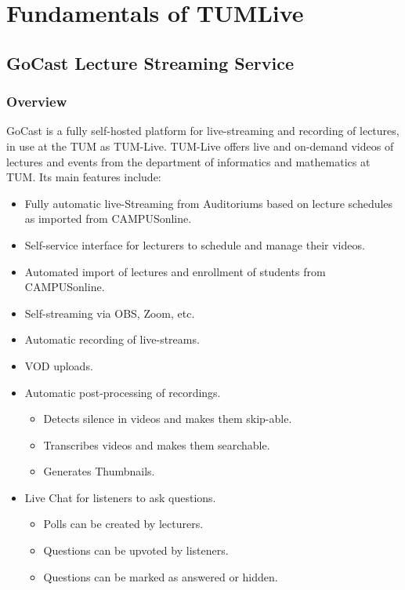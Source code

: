 
\chapter{Fundamentals of TUMLive}\label{chapter:fundamentals}

\section{GoCast Lecture Streaming Service}

\subsection{Overview}

GoCast is a fully self-hosted platform for live-streaming and recording of lectures, in use at the \ac{TUM} as TUM-Live.
TUM-Live offers live and on-demand videos of lectures and events from the department of informatics and mathematics at \ac{TUM}. 
Its main features include:

\begin{itemize}
    \item Fully automatic live-Streaming from Auditoriums based on lecture schedules as imported from CAMPUSonline.
    \item Self-service interface for lecturers to schedule and manage their videos.
    \item Automated import of lectures and enrollment of students from CAMPUSonline.
    \item Self-streaming via OBS, Zoom, etc.
    \item Automatic recording of live-streams.
    \item \ac{VOD} uploads.
    \item Automatic post-processing of recordings.
    \begin{itemize}
        \item Detects silence in videos and makes them skip-able.
        \item Transcribes videos and makes them searchable.
        \item Generates Thumbnails.
    \end{itemize}
    \item Live Chat for listeners to ask questions.
    \begin{itemize}
        \item Polls can be created by lecturers.
        \item Questions can be upvoted by listeners.
        \item Questions can be marked as answered or hidden.
    \end{itemize}
\end{itemize}

